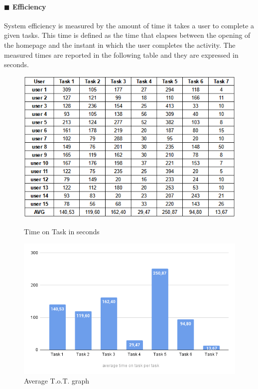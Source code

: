 \documentclass[11pt]{article} %
\begin{document}
\paragraph{$\blacksquare$ Efficiency}
System efficiency is measured by the amount of time it takes a user to complete a given tasks. This time is defined as the time that elapses between the opening of the homepage and the instant in which the user completes the activity. The measured times are reported in the following table and they are expressed in seconds.\pagebreak
\begin{figure}[ht]
  \centering
  \begin{minipage}[b]{0.48\textwidth}
    \includegraphics[width=\textwidth]{Images/table2.png}
    \caption{Time on Task in seconds}
  \end{minipage}
  \hfill
  \begin{minipage}[b]{0.48\textwidth}
    \includegraphics[width=\textwidth]{Images/totAVG.png}
    \caption{Average T.o.T. graph}
  \end{minipage}
\end{figure}\\
\end{document}

